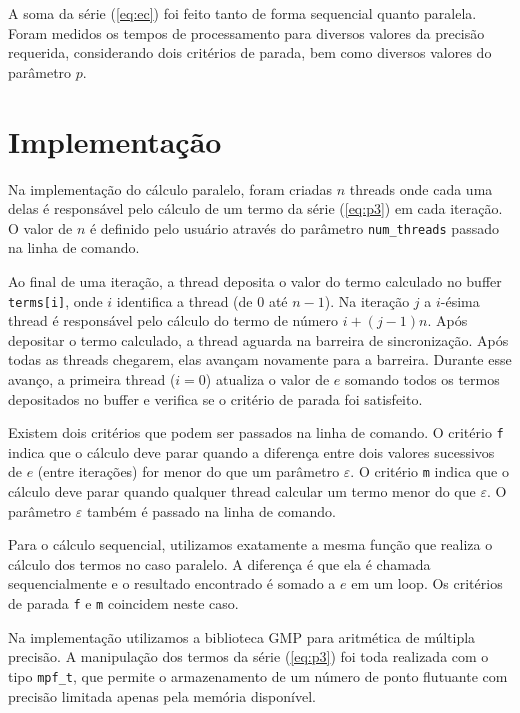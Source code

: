 \documentclass[12pt]{article}
\begin{document}
A soma da série (\ref{eq:ec}) foi feito tanto de forma sequencial quanto paralela. Foram medidos 
os tempos de processamento para diversos valores da precisão requerida, considerando dois critérios 
de parada, bem como diversos valores do parâmetro $p$.


\section{Implementação}

Na implementação do cálculo paralelo, foram criadas $n$ threads onde cada uma delas
é responsável pelo cálculo de um termo da série (\ref{eq:p3}) em cada iteração. O valor de $n$ é
definido pelo usuário através do parâmetro \verb|num_threads| passado na linha de comando.

Ao final de uma iteração, a thread deposita o valor do termo calculado no buffer \verb|terms[i]|,
onde $i$ identifica a thread (de $0$ até $n - 1$). Na iteração $j$ a $i$-ésima thread é 
responsável pelo cálculo do termo de número $i + (j - 1) n$. Após depositar o termo calculado, a 
thread aguarda na barreira de sincronização. Após todas as threads chegarem, elas avançam novamente 
para a barreira. Durante esse avanço, a primeira thread ($i = 0$) atualiza o valor de $e$ somando 
todos os termos depositados no buffer e verifica se o critério de parada foi satisfeito.

Existem dois critérios que podem ser passados na linha de comando. O critério \verb|f| indica que 
o cálculo deve parar quando a diferença entre dois valores sucessivos de $e$ (entre iterações) for 
menor do que um parâmetro $\varepsilon$. O critério \verb|m| indica que o cálculo deve parar quando 
qualquer thread calcular um termo menor do que $\varepsilon$. O parâmetro $\varepsilon$ também é 
passado na linha de comando.

Para o cálculo sequencial, utilizamos exatamente a mesma função que realiza o cálculo dos termos no
caso paralelo. A diferença é que ela é chamada sequencialmente e o resultado encontrado é somado a 
$e$ em um loop. Os critérios de parada \verb|f| e \verb|m| coincidem neste caso. 

Na implementação utilizamos a biblioteca GMP para aritmética de múltipla precisão. A manipulação dos
termos da série (\ref{eq:p3}) foi toda realizada com o tipo \verb|mpf_t|, que permite o 
armazenamento de um número de ponto flutuante com precisão limitada apenas pela memória disponível. 
\end{document}
